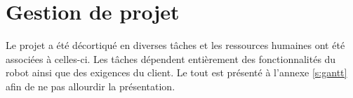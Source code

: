 


\chapter{Gestion de projet}
\label{s:projet}
Le projet a été décortiqué en diverses tâches et les ressources humaines ont été associées à celles-ci. Les tâches dépendent entièrement des fonctionnalités du robot ainsi que des exigences du client. Le tout est présenté à l'annexe \ref{s:gantt} afin de ne pas allourdir la présentation.